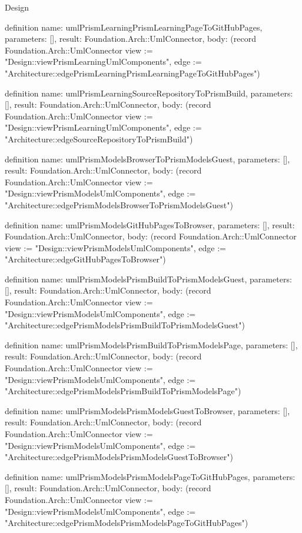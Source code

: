 \begin{lexlean}{Design}
\begin{semanticmodule}
definition{
  name: umlPrismLearningPrismLearningPageToGitHubPages,
  parameters: [],
  result: Foundation.Arch::UmlConnector,
  body: (record Foundation.Arch::UmlConnector {view := "Design::viewPrismLearningUmlComponents", edge := "Architecture::edgePrismLearningPrismLearningPageToGitHubPages"})
}

definition{
  name: umlPrismLearningSourceRepositoryToPrismBuild,
  parameters: [],
  result: Foundation.Arch::UmlConnector,
  body: (record Foundation.Arch::UmlConnector {view := "Design::viewPrismLearningUmlComponents", edge := "Architecture::edgeSourceRepositoryToPrismBuild"})
}

definition{
  name: umlPrismModelsBrowserToPrismModelsGuest,
  parameters: [],
  result: Foundation.Arch::UmlConnector,
  body: (record Foundation.Arch::UmlConnector {view := "Design::viewPrismModelsUmlComponents", edge := "Architecture::edgePrismModelsBrowserToPrismModelsGuest"})
}

definition{
  name: umlPrismModelsGitHubPagesToBrowser,
  parameters: [],
  result: Foundation.Arch::UmlConnector,
  body: (record Foundation.Arch::UmlConnector {view := "Design::viewPrismModelsUmlComponents", edge := "Architecture::edgeGitHubPagesToBrowser"})
}

definition{
  name: umlPrismModelsPrismBuildToPrismModelsGuest,
  parameters: [],
  result: Foundation.Arch::UmlConnector,
  body: (record Foundation.Arch::UmlConnector {view := "Design::viewPrismModelsUmlComponents", edge := "Architecture::edgePrismModelsPrismBuildToPrismModelsGuest"})
}

definition{
  name: umlPrismModelsPrismBuildToPrismModelsPage,
  parameters: [],
  result: Foundation.Arch::UmlConnector,
  body: (record Foundation.Arch::UmlConnector {view := "Design::viewPrismModelsUmlComponents", edge := "Architecture::edgePrismModelsPrismBuildToPrismModelsPage"})
}

definition{
  name: umlPrismModelsPrismModelsGuestToBrowser,
  parameters: [],
  result: Foundation.Arch::UmlConnector,
  body: (record Foundation.Arch::UmlConnector {view := "Design::viewPrismModelsUmlComponents", edge := "Architecture::edgePrismModelsPrismModelsGuestToBrowser"})
}

definition{
  name: umlPrismModelsPrismModelsPageToGitHubPages,
  parameters: [],
  result: Foundation.Arch::UmlConnector,
  body: (record Foundation.Arch::UmlConnector {view := "Design::viewPrismModelsUmlComponents", edge := "Architecture::edgePrismModelsPrismModelsPageToGitHubPages"})
}


\end{semanticmodule}
\end{lexlean}
